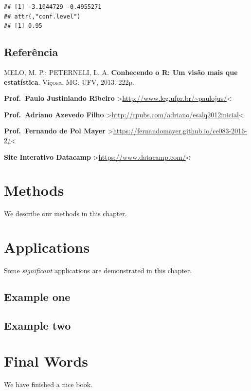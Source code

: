 \documentclass[]{book}
\newenvironment{Shaded}{\begin{snugshade}}{\end{snugshade}}
\newcommand{\CommentTok}[1]{\textcolor[rgb]{0.56,0.35,0.01}{\textit{#1}}}
\newcommand{\NormalTok}[1]{#1}
\newcommand{\OperatorTok}[1]{\textcolor[rgb]{0.81,0.36,0.00}{\textbf{#1}}}
\begin{document}
\begin{Shaded}
\end{Shaded}

\begin{verbatim}
## [1] -3.1044729 -0.4955271
## attr(,"conf.level")
## [1] 0.95
\end{verbatim}

\hypertarget{referencia-1}{%
\section{Referência}\label{referencia-1}}

MELO, M. P.; PETERNELI, L. A. \textbf{Conhecendo o R: Um visão mais que estatística}. Viçosa, MG: UFV, 2013. 222p.

\textbf{Prof.~Paulo Justiniando Ribeiro} \textgreater{}\url{http://www.leg.ufpr.br/~paulojus/}\textless{}

\textbf{Prof.~Adriano Azevedo Filho} \textgreater{}\url{http://rpubs.com/adriano/esalq2012inicial}\textless{}

\textbf{Prof.~Fernando de Pol Mayer} \textgreater{}\url{https://fernandomayer.github.io/ce083-2016-2/}\textless{}

\textbf{Site Interativo Datacamp} \textgreater{}\url{https://www.datacamp.com/}\textless{}

\hypertarget{methods}{%
\chapter{Methods}\label{methods}}

We describe our methods in this chapter.

\hypertarget{applications}{%
\chapter{Applications}\label{applications}}

Some \emph{significant} applications are demonstrated in this chapter.

\hypertarget{example-one}{%
\section{Example one}\label{example-one}}

\hypertarget{example-two}{%
\section{Example two}\label{example-two}}

\hypertarget{final-words}{%
\chapter{Final Words}\label{final-words}}

We have finished a nice book.


\end{document}
